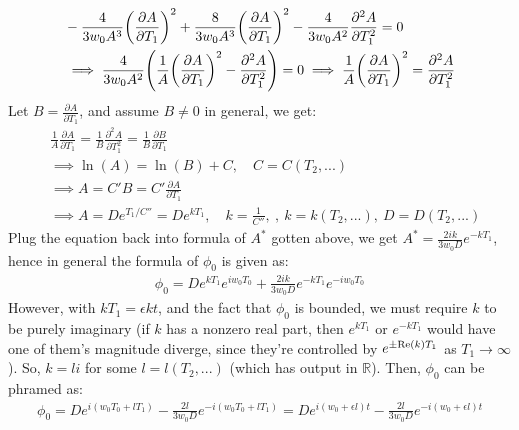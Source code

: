 \documentclass{article}
\newcommand{\RR}{\mathbb{R}}
\DeclarePairedDelimiter{\paran}{(}{)}%
\newcommand{\Real}{\textmd{Re}}
\begin{document}
\begin{align}
    &-\frac{4}{3w_0A^3}\paran*{\frac{\partial A}{\partial T_1}}^2+\frac{8}{3w_0A^3}\paran*{\frac{\partial A}{\partial T_1}}^2-\frac{4}{3w_0A^2}\frac{\partial^2A}{\partial T_1^2}=0\\
    &\implies \frac{4}{3w_0A^2}\paran*{\frac{1}{A}\paran*{\frac{\partial A}{\partial T_1}}^2-\frac{\partial^2 A}{\partial T_1^2}}=0 \implies \frac{1}{A}\paran*{\frac{\partial A}{\partial T_1}}^2=\frac{\partial ^2A}{\partial T_1^2}
\end{align}
Let $B=\frac{\partial A}{\partial T_1}$, and assume $B\neq 0$ in general, we get:
\begin{align}
    &\frac{1}{A}\frac{\partial A}{\partial T_1}=\frac{1}{B}\frac{\partial^2A}{\partial T_1^2}=\frac{1}{B}\frac{\partial B}{\partial T_1}\\
    &\implies \ln(A) = \ln(B)+C,\quad C=C(T_2,...)\\
    &\implies A = C'B = C' \frac{\partial A}{\partial T_1}\\
    &\implies A = De^{T_1/C''} = De^{kT_1},\quad k=\frac{1}{C''},\ ,\ k=k(T_2,...),\ D=D(T_2,...)
\end{align}
Plug the equation back into formula of $A^*$ gotten above, we get $A^* = \frac{2ik}{3w_0D}e^{-kT_1}$, hence in general the formula of $\phi_0$ is given as:
\begin{align}
    \phi_0 = De^{kT_1}e^{iw_0T_0}+\frac{2ik}{3w_0D}e^{-kT_1}e^{-iw_0T_0}
\end{align}
However, with $kT_1 = \epsilon kt$, and the fact that $\phi_0$ is bounded, we must require $k$ to be purely imaginary (if $k$ has a nonzero real part, then $e^{kT_1}$ or $e^{-kT_1}$ would have one of them's magnitude diverge, since they're controlled by $e^{\pm\Real(k)T_1}$ as $T_1\rightarrow\infty$). So, $k = li$ for some $l=l(T_2,...)$ (which has output in $\RR$). Then, $\phi_0$ can be phramed as:
\begin{align}
    \phi_0 = De^{i(w_0T_0+lT_1)}-\frac{2l}{3w_0D}e^{-i(w_0T_0+lT_1)} = De^{i(w_0+\epsilon l)t}-\frac{2l}{3w_0D}e^{-i(w_0+\epsilon l)t}
\end{align}
\end{document}
